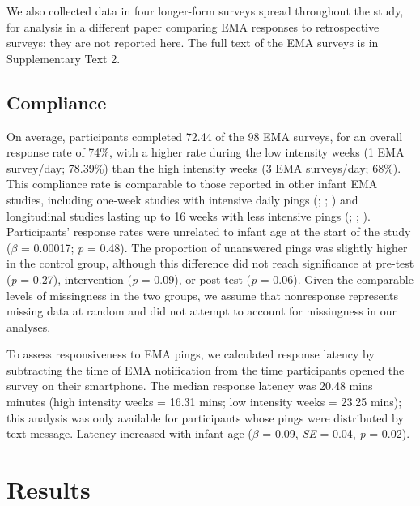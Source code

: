 \documentclass[
]{article}
\begin{document}
We also collected data in four longer-form surveys spread throughout the
study, for analysis in a different paper comparing EMA responses to
retrospective surveys; they are not reported here. The full text of the
EMA surveys is in Supplementary Text 2.

\subsection{Compliance}\label{compliance}

On average, participants completed 72.44 of the 98 EMA surveys, for an
overall response rate of 74\%, with a higher rate during the low
intensity weeks (1 EMA survey/day; 78.39\%) than the high intensity
weeks (3 EMA surveys/day; 68\%). This compliance rate is comparable to
those reported in other infant EMA studies, including one-week studies
with intensive daily pings (; ;
) and longitudinal studies
lasting up to 16 weeks with less intensive pings
(;
;
). Participants' response
rates were unrelated to infant age at the start of the study (\(\beta\)
= 0.00017; \emph{p} = 0.48). The proportion of unanswered pings was
slightly higher in the control group, although this difference did not
reach significance at pre-test (\emph{p} = 0.27), intervention (\emph{p}
= 0.09), or post-test (\emph{p} = 0.06). Given the comparable levels of
missingness in the two groups, we assume that nonresponse represents
missing data at random and did not attempt to account for missingness in
our analyses.

To assess responsiveness to EMA pings, we calculated response latency by
subtracting the time of EMA notification from the time participants
opened the survey on their smartphone. The median response latency was
20.48 mins minutes (high intensity weeks = 16.31 mins; low intensity
weeks = 23.25 mins); this analysis was only available for participants
whose pings were distributed by text message. Latency increased with
infant age (\(\beta\) = 0.09, \emph{SE} = 0.04, \emph{p} = 0.02).

\section{Results}\label{results}
\end{document}
